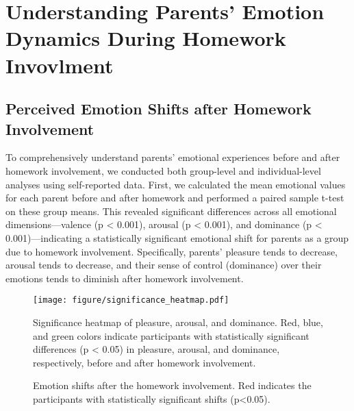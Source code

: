 
\section{Understanding Parents' Emotion Dynamics During Homework Invovlment}




\subsection{Perceived Emotion Shifts after Homework Involvement} 
To comprehensively understand parents' emotional experiences before and after homework involvement, we conducted both group-level and individual-level analyses using self-reported data. First, we calculated the mean emotional values for each parent before and after homework and performed a paired sample t-test on these group means. This revealed significant differences across all emotional dimensions—valence (p < 0.001), arousal (p < 0.001), and dominance (p < 0.001)—indicating a statistically significant emotional shift for parents as a group due to homework involvement. Specifically, parents' pleasure tends to decrease, arousal tends to decrease, and their sense of control (dominance) over their emotions tends to diminish after homework involvement. 

\begin{figure}
    \centering
    \texttt{[image: figure/significance\_heatmap.pdf]}
    \caption{Significance heatmap of pleasure, arousal, and dominance. Red, blue, and green colors indicate participants with statistically significant differences (p < 0.05) in pleasure, arousal, and dominance, respectively, before and after homework involvement.}
    \label{fig:heatmap}
\end{figure}

\begin{figure}
	\hspace{0cm}
    \caption{Emotion shifts after the homework involvement. Red indicates the participants with statistically significant shifts (p<0.05). }
    \label{fig: daily_survey_emotion}
\end{figure}


